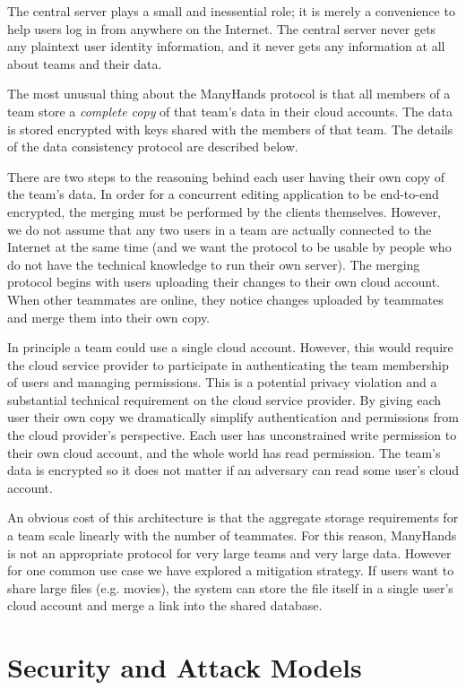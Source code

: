 \documentclass[pldi,10pt]{sigplanconf-pldi16}
\begin{document}
The central server plays a small and inessential role; it is merely a convenience to help users log in from anywhere on the Internet.
The central server never gets any plaintext user identity information, and it never gets any information at all about teams and their data.

The most unusual thing about the ManyHands protocol is that all members of a team store a \emph{complete copy} of that team's data in their cloud accounts.
The data is stored encrypted with keys shared with the members of that team.
The details of the data consistency protocol are described below.

There are two steps to the reasoning behind each user having their own copy of the team's data.
In order for a concurrent editing application to be end-to-end encrypted, the merging must be performed by the clients themselves.
However, we do not assume that any two users in a team are actually connected to the Internet at the same time (and we want the protocol to be usable by people who do not have the technical knowledge to run their own server).
The merging protocol begins with users uploading their changes to their own cloud account.
When other teammates are online, they notice changes uploaded by teammates and merge them into their own copy.

In principle a team could use a single cloud account.
However, this would require the cloud service provider to participate in authenticating the team membership of users and managing permissions.
This is a potential privacy violation and a substantial technical requirement on the cloud service provider.
By giving each user their own copy we dramatically simplify authentication and permissions from the cloud provider's perspective.
Each user has unconstrained write permission to their own cloud account, and the whole world has read permission.
The team's data is encrypted so it does not matter if an adversary can read some user's cloud account.

An obvious cost of this architecture is that the aggregate storage requirements for a team scale linearly with the number of teammates.
For this reason, ManyHands is not an appropriate protocol for very large teams and very large data.
However for one common use case we have explored a mitigation strategy.
If users want to share large files (e.g. movies), the system can store the file itself in a single user's cloud account and merge a link into the shared database.

\section{Security and Attack Models}
\end{document}
